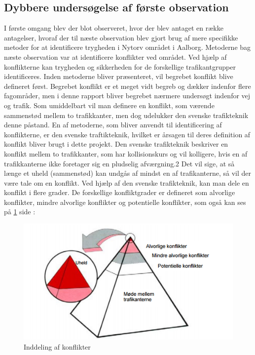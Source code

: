 \subsection{Dybbere undersøgelse af første observation}
\label{sub:dyb_undersoelse}
I første omgang blev der blot observeret, hvor der blev antaget en række antagelser, hvoraf der til næste observation blev gjort brug af mere specifikke metoder for at identificere trygheden i Nytorv området i Aalborg.
Metoderne bag næste observation var at identificere konflikter ved området. Ved hjælp af konflikterne kan trygheden og sikkerheden for de forskellige trafikantgrupper identificeres. Inden metoderne bliver præsenteret, vil begrebet konflikt blive defineret først. Begrebet konflikt er et meget vidt begreb og dækker indenfor flere fagområder, men i denne rapport bliver begrebet nærmere undersøgt indenfor vej og trafik. Som umiddelbart vil man definere en konflikt, som værende sammenstød mellem to trafikkanter, men dog udelukker den svenske trafikteknik denne påstand.%
En af metoderne, som bliver anvendt til identificering af konflikterne, er den svenske traftikteknik, hvilket er årsagen til deres definition af konflikt bliver brugt i dette projekt.
Den svenske trafikteknik beskriver en konflikt mellem to trafikkanter, som har kollisionskurs og vil kolligere, hvis en af trafikkanterne ikke foretager sig en pludselig afværgning.2 Det vil sige, at så længe et uheld (sammenstød) kan undgås af mindst en af trafikanterne, så vil der være tale om en konflikt. Ved hjælp af den svenske trafikteknik, kan man dele en konflikt i flere grader. De forskellige konfliktgrader er defineret som alvorlige konflikter, mindre alvorlige konflikter og potentielle konflikter, som også kan ses på \cref{fig:indellingkonflikter} side \pageref{fig:indellingkonflikter}:
 \begin{figure}[htbp]
   \centering
   \begin{adjustbox}{max width=\textwidth}
     \includegraphics{figures/Billederogfigur/konflikt.png} %
  \end{adjustbox}
   \caption{Inddeling af konflikter}
    \label{fig:indellingkonflikter}
 \end{figure}
 \newpage


